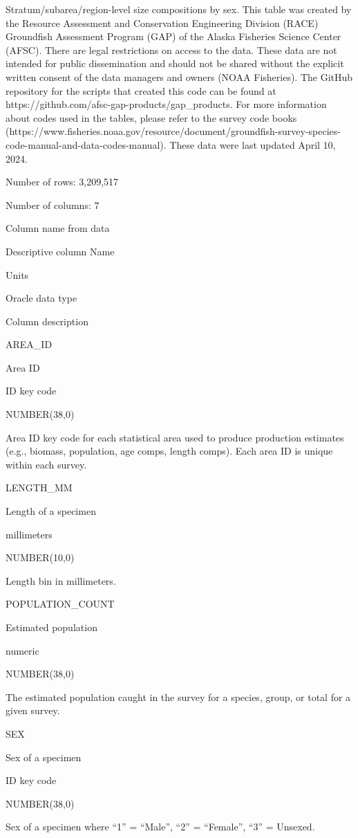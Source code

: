 \documentclass[
  letterpaper,
  oneside,
  open=any]{scrbook}
\begin{document}
Stratum/subarea/region-level size compositions by sex. This table was
created by the Resource Assessment and Conservation Engineering Division
(RACE) Groundfish Assessment Program (GAP) of the Alaska Fisheries
Science Center (AFSC). There are legal restrictions on access to the
data. These data are not intended for public dissemination and should
not be shared without the explicit written consent of the data managers
and owners (NOAA Fisheries). The GitHub repository for the scripts that
created this code can be found at
https://github.com/afsc-gap-products/gap\_products. For more information
about codes used in the tables, please refer to the survey code books
(https://www.fisheries.noaa.gov/resource/document/groundfish-survey-species-code-manual-and-data-codes-manual).
These data were last updated April 10, 2024.

Number of rows: 3,209,517

Number of columns: 7

Column name from data

Descriptive column Name

Units

Oracle data type

Column description

AREA\_ID

Area ID

ID key code

NUMBER(38,0)

Area ID key code for each statistical area used to produce production
estimates (e.g., biomass, population, age comps, length comps). Each
area ID is unique within each survey.

LENGTH\_MM

Length of a specimen

millimeters

NUMBER(10,0)

Length bin in millimeters.

POPULATION\_COUNT

Estimated population

numeric

NUMBER(38,0)

The estimated population caught in the survey for a species, group, or
total for a given survey.

SEX

Sex of a specimen

ID key code

NUMBER(38,0)

Sex of a specimen where ``1'' = ``Male'', ``2'' = ``Female'', ``3'' =
Unsexed.
\end{document}
